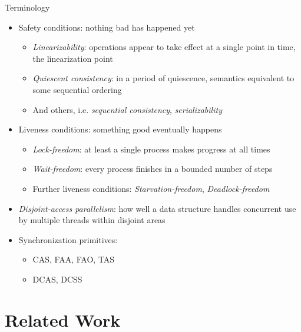 \documentclass[usenames,dvipsnames]{beamer}
\begin{document}
\begin{frame}[allowframebreaks]{Terminology}
\begin{itemize}
\item Safety conditions: nothing bad has happened yet
    \begin{itemize}
    \item \emph{Linearizability}: operations appear to take effect at a single point in time, the linearization point
    \item \emph{Quiescent consistency}: in a period of quiescence, semantics equivalent to some sequential ordering
    \item And others, i.e. \emph{sequential consistency}, \emph{serializability}
    \end{itemize}

\framebreak

\item Liveness conditions: something good eventually happens
    \begin{itemize}
    \item \emph{Lock-freedom}: at least a single process makes progress at all times
    \item \emph{Wait-freedom}: every process finishes in a bounded number of steps
    \item Further liveness conditions: \emph{Starvation-freedom}, \emph{Deadlock-freedom}
    \end{itemize}

\framebreak

\item \emph{Disjoint-access parallelism}: how well a data structure handles concurrent use by multiple
      threads within disjoint areas
\item Synchronization primitives:
    \begin{itemize}
    \item \ac{CAS}, \ac{FAA}, \ac{FAO}, \ac{TAS}
    \item \ac{DCAS}, \ac{DCSS}
    \end{itemize}

\end{itemize}

\end{frame}

\section{Related Work}
\end{document}
